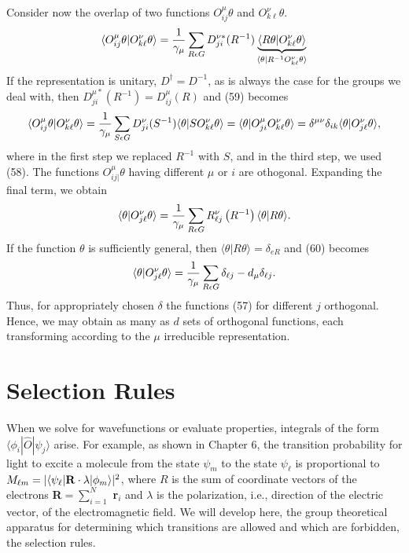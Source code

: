 Consider now the overlap of two functions 
$O^{\mu}_{ij} \theta$ and $O^{\nu}_{k \ell} \theta$.
\begin{equation}
\langle O^{\mu}_{ij} \theta | O^{\nu}_{k\ell} \theta \rangle = {1 
\over \gamma_{\mu}} \sum_{R \epsilon G} D^{\nu *}_{ji} (R^{-1}) 
\underbrace{\langle R \theta | O^{\nu}_{k\ell} \theta 
\rangle}_{\langle \theta | R^{-1} O^{\nu}_{k\ell} \theta 
\rangle}
\label{chap16-eqno59}
\end{equation}
If the representation is unitary, $D^{\dag} = D^{-1}$, as is always 
the case for the groups we deal with, then $D^{\mu *}_{ji}(R^{-1}) = 
D^{\mu}_{ij}(R)$ and (59) becomes
\begin{equation}
\langle O^{\mu}_{ij} \theta | O^{\nu}_{k\ell} \theta \rangle = 
{1 \over \gamma_{\mu}} \sum_{S \epsilon G} D^{\nu}_{ji} (S^{-1}) 
\langle \theta | SO^{\nu}_{k\ell} \theta \rangle = \langle \theta | 
O^{\mu}_{ji} O^{\nu}_{k\ell} \theta \rangle = \delta^{\mu \nu} 
\delta_{ik} \langle \theta | O^{\nu}_{j\ell} \theta \rangle ,
\end{equation}
where in the first step we replaced $R^{-1}$ with $S$, and in the third 
step, we used (58).  The functions $O^{\mu}_{ij|} \theta$ having 
different $\mu$ or $i$ are othogonal.  Expanding the final term, we 
obtain
\begin{equation}
\langle \theta | O^{\nu}_{j\ell} \theta \rangle = {1 \over 
\gamma_{\mu}} \sum_{R \epsilon G} R^{\nu}_{\ell j} \left( R^{-1} 
\right) \langle \theta | R \theta \rangle .
\label{chap16-eqno60}
\end{equation}
If the function $\theta$ is sufficiently general, then $\langle 
\theta | R \theta \rangle = \delta_{eR}$ and (60) becomes
\begin{equation}
\langle \theta | O^{\nu}_{j\ell} \theta \rangle = {1 \over 
\gamma_{\mu}} \sum_{R \epsilon G} \delta_{\ell j} - d_{\mu} 
\delta_{\ell j}.
\end{equation}
Thus, for appropriately chosen $\delta$ the functions (57) for 
different $j$ orthogonal.  Hence, we may obtain as many as $d$ sets 
of orthogonal functions, each transforming according to the $\mu$ 
irreducible representation.

\section{Selection Rules}

When we solve for wavefunctions or evaluate properties, integrals of 
the form $\langle \phi_i | {\hat{O}} | \psi_j \rangle$ arise.  For 
example, as shown in Chapter 6, the transition probability for light 
to excite a molecule from the state $\psi_m$ to the state 
$\psi_{\ell}$ is proportional to $M_{\ell m} = | \langle 
\psi_{\ell} | {\bf R} \cdot \lambda | \phi_m \rangle |^2$, where $R$ 
is the sum of coordinate vectors of the electrons {\bf R}$ = 
\sum^N_{i=1}$ {\bf r}$_i$ and $\lambda$ is the polarization, i.e., 
direction of the electric vector, of the electromagnetic field.  We 
will develop here, the group theoretical apparatus for determining 
which transitions are allowed and which are forbidden, the selection 
rules.

